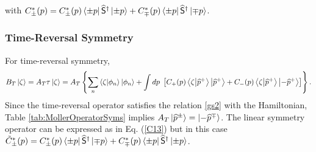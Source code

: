 %
with $C_{\pm}^*(p) = C_{\pm}^*(p) \bra{\pm p} \widehat{\mathsf{S}}^\dagger \ket{\pm p} + C_{\mp}^*(p) \bra{\pm p} \widehat{\mathsf{S}}^\dagger \ket{\mp p}$.

\subsubsection{Time-Reversal Symmetry}
%
For time-reversal symmetry,
%
\begin{equation}
    B_{T}\ket{\zeta} = A_{T}\tau\ket{\zeta} = A_{T} \left\{ \sum_n  \braket{\zeta}{\phi_n} \ket{\phi_n} + \int dp\; \left[ C_+(p) \braket{\zeta}{\widehat{p}^+}\ket{\widehat{p}^+} + C_-(p)\braket{\zeta}{\widehat{p}^+}\ket{-\widehat{p}^+} \right] \right\}.
\end{equation}
%
Since the time-reversal operator satisfies the relation \eqref{gs2} with the Hamiltonian, Table \ref{tab:MollerOperatorSyms} implies $A_T\ket{\widehat{p}^\pm} = \ket{-\widehat{p}^\mp}$. The linear symmetry operator can be expressed as in Eq. (\ref{C13}) but in this case $\tilde{C}_{\pm}^*(p) = C_{\pm}^*(p) \bra{\pm p} \widehat{\mathsf{S}}^\dagger \ket{\mp p} + C_{\mp}^*(p) \bra{\pm p} \widehat{\mathsf{S}}^\dagger \ket{\pm p}$.

